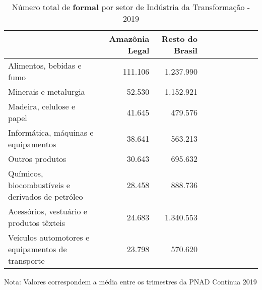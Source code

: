 \begin{table}[H]
\centering
\label{\_retrato\_emprego\_setor\_sgap\_trans\_table\_n\_de\_formal}
\begin{threeparttable}
\caption{Número total de \textbf{formal} por setor de Indústria da Transformação - 2019}
\begin{tabular}{l*{3}{rrr}}
\midrule \midrule
                    &Amazônia Legal&Resto do Brasil\\
\midrule
Alimentos, bebidas e fumo&     111.106&   1.237.990\\
Minerais e metalurgia&      52.530&   1.152.921\\
Madeira, celulose e papel&      41.645&     479.576\\
Informática, máquinas e equipamentos&      38.641&     563.213\\
Outros produtos     &      30.643&     695.632\\
Químicos, biocombustíveis e derivados de petróleo&      28.458&     888.736\\
Acessórios, vestuário e produtos têxteis&      24.683&   1.340.553\\
Veículos automotores e equipamentos de transporte&      23.798&     570.620\\
\bottomrule
\end{tabular}
\begin{tablenotes}
\scriptsize{Nota: Valores correspondem a média entre os trimestres da PNAD Contínua 2019}
\end{tablenotes}
\end{threeparttable}
\end{table}
